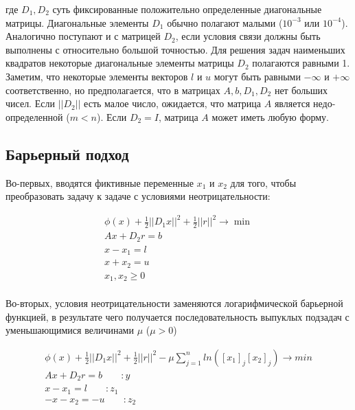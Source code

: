 \documentclass[a4paper, 12pt, titlepage]{article}
\theoremstyle{definition}
\theoremstyle{plain}
\theoremstyle{plain}
\begin{document}
где $D_{1}, D_{2}$ суть фиксированные положительно определенные диагональные
матрицы. Диагональные элементы $D_{1}$ обычно полагают малыми ($10^{-3}$ или
$10^{-4}$). Аналогично поступают и с матрицей $D_{2}$, если условия связи
должны быть выполнены с относительно большой точностью. Для решения задач
наименьших квадратов некоторые диагональные элементы матрицы $D_{2}$ полагаются
равными 1. Заметим, что некоторые элементы векторов $l$ и $u$ могут быть 
равными $-\infty$ и $+\infty$ соответственно, но предполагается, что в матрицах
$A, b, D_{1}, D_{2}$ нет больших чисел. Если $||D_{2}||$ есть малое число,
ожидается, что матрица $A$ является недо-определенной ($m < n$). Если
$D_{2} = I$, матрица $A$ может иметь любую форму.

\subsection{Барьерный подход}
Во-первых, вводятся фиктивные переменные $x_{1}$ и $x_{2}$ для того, чтобы
преобразовать задачу к задаче с условиями неотрицательности:

\begin{equation}
 \label{eq:co}
 \begin{aligned}
  \phi(x) + \frac{1}{2}||D_{1} x||^{2} + \frac{1}{2}||r||^{2} \to \min \\
  A x + D_{2} r = b \\
  x - x_{1} = l \\
  x + x_{2} = u \\
  x_{1}, x_{2} \geq 0 \\
 \end{aligned}
\end{equation}

Во-вторых, условия неотрицательности заменяются логарифмической барьерной
функцией, в результате чего получается последовательность выпуклых подзадач с
уменьшающимися величинами $\mu$ ($\mu > 0$)

\begin{equation}
 \label{eq:co-mu}
 \begin{aligned}
  \phi(x) + \frac{1}{2}||D_{1} x||^{2} + \frac{1}{2}||r||^{2} -
  \mu \sum \limits_{j = 1}^{n} ln([x_{1}]_{j} [x_{2}]_{j}) \to min \\
  A x + D_{2} r = b \;\;\;\;\;\;\; : y\\
  x - x_{1} = l \;\;\;\;\;\;\; : z_{1}\\
  -x - x_{2} = -u \;\;\;\;\;\;\; : z_{2}\\
 \end{aligned}
\end{equation}
\end{document}
